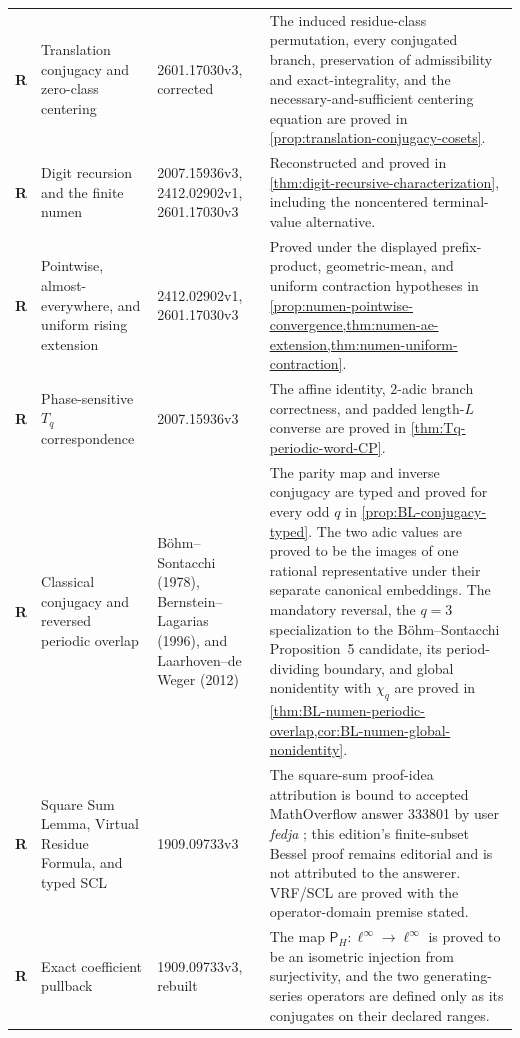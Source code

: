\begin{longtable}{@{}p{}p{}p{}p{}@{}}
\textbf{R} & Translation conjugacy and zero-class centering &
2601.17030v3, corrected & The induced residue-class permutation, every
conjugated branch, preservation of admissibility and exact-integrality, and
the necessary-and-sufficient centering equation are proved in
\cref{prop:translation-conjugacy-cosets}.\\

\textbf{R} & Digit recursion and the finite numen & 2007.15936v3,
2412.02902v1, 2601.17030v3 & Reconstructed and proved in
\cref{thm:digit-recursive-characterization}, including the noncentered
terminal-value alternative.\\

\textbf{R} & Pointwise, almost-everywhere, and uniform rising extension &
2412.02902v1, 2601.17030v3 & Proved under the displayed prefix-product,
geometric-mean, and uniform contraction hypotheses in
\cref{prop:numen-pointwise-convergence,thm:numen-ae-extension,thm:numen-uniform-contraction}.\\

\textbf{R} & Phase-sensitive $T_q$ correspondence & 2007.15936v3 & The
affine identity, $2$-adic branch correctness, and padded length-$L$ converse
are proved in \cref{thm:Tq-periodic-word-CP}.\\

\textbf{R} & Classical conjugacy and reversed periodic overlap &
B\"ohm--Sontacchi (1978), Bernstein--Lagarias (1996), and
Laarhoven--de Weger (2012) & The parity map and inverse conjugacy are typed
and proved for every odd $q$ in \cref{prop:BL-conjugacy-typed}.  The two
adic values are proved to be the images of one rational representative under
their separate canonical embeddings.  The mandatory reversal, the $q=3$
specialization to the B\"ohm--Sontacchi Proposition~5 candidate, its
period-dividing boundary, and global nonidentity with $\chi_q$ are proved in
\cref{thm:BL-numen-periodic-overlap,cor:BL-numen-global-nonidentity}.\\

\textbf{R} & Square Sum Lemma, Virtual Residue Formula, and typed SCL &
1909.09733v3 & The square-sum proof-idea attribution is bound to accepted
MathOverflow answer 333801 by user \emph{fedja} \cite{FedjaMO333801}; this
edition's finite-subset Bessel proof remains editorial and is not attributed
to the answerer.  VRF/SCL are proved with the operator-domain premise stated.\\

\textbf{R} & Exact coefficient pullback & 1909.09733v3, rebuilt & The map
$\mathsf P_H:\ell^\infty\to\ell^\infty$ is proved to be an isometric
injection from surjectivity, and the two generating-series operators are
defined only as its conjugates on their declared ranges.\\


\end{longtable}
